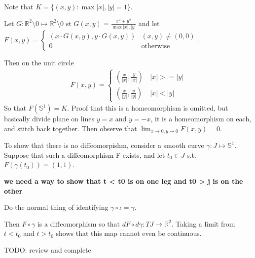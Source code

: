 Note that $K = \{(x,y): \max{|x|,|y|}=1\}$.

Let $G:\mathbb{R}^2 \setminus 0 \mapsto \mathbb{R}^2 \setminus 0$ st $G(x,y) = \frac{x^2+y^2}{\max{|x|, |y|}}$ and let $F(x,y) = \begin{cases}(x\cdot G(x,y), y\cdot G(x,y))& (x,y) \neq (0,0)\\ 0& \textrm{otherwise}\end{cases}$.

Then on the unit circle 
\begin{align*}
F(x,y) = 
\begin{cases} 
(\frac{x}{|x|},\frac{y}{|x|}) & \, |x| >= |y|\\
(\frac{x}{|y|},\frac{y}{|y|}) & \, |x| < |y|
\end{cases}
\end{align*}
So that $F(\mathbb{S}^1) = K$.  Proof that this is a homeomorphism is omitted, but basically divide plane on lines $y = x$ and $y = -x$, it is a homeomorphism on each, and stitch back together.  Then observe that $\lim_{x\to 0,y \to 0} F(x,y) = 0$.

To show that there is no diffeomorpishm, consider a smooth curve $\gamma:J \mapsto \mathbb{S}^1$.  Suppose that such a diffeomorphism F exists, and let $t_0 \in J$ s.t. $F(\gamma(t_0)) = (1,1)$.

\textbf{we need a way to show that t < t0 is on one leg and t0 > j is on the other}

Do the normal thing of identifying $\gamma \circ \iota = \gamma$.

Then $F \circ \gamma$ is a diffeomorphism so that $dF \circ d\gamma:TJ \to \mathbb{R}^2$.  Taking a limit from $t < t_0$ and $t > t_0$ shows that this map cannot even be continuous.

TODO: review and complete